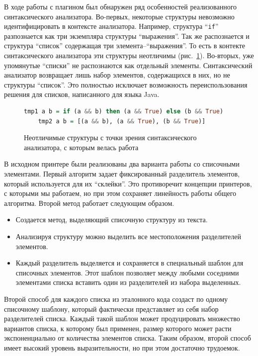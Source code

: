 В ходе работы с плагином был обнаружен ряд особенностей реализованного синтаксического анализатора. Во-первых, некоторые структуры невозможно идентифицировать в контексте анализатора. Например, структура ``\lstinline{if}'' разпознается как три экземпляра структуры ``выражения''. Так же распознается и структура ``список'' содержащая три элемента--``выражения''. То есть в контекте синтаксического анализатора эти структуры неотличимы (рис.~\ref{haskellAnalyzerIncorrect}). Во-вторых, уже упомянутые ``списки'' не распознаются как отдельный элементы. Синтаксический анализатор возвращает лишь набор элементов, содержащихся в них, но не структуры ``список''. Это полностью исключает возможность переиспользования решения для списков, написанного для языка Java.

\begin{figure}[H]
    \begin{lstlisting}[language=Haskell]
    tmp1 a b = if (a && b) then (a && True) else (b && True)
    tmp2 a b = [(a && b), (a && True), (b && True)]
    \end{lstlisting}
\caption{Неотличимые структуры с точки зрения синтаксического анализатора, с которым велась работа}   
\label{haskellAnalyzerIncorrect}
\end{figure}

В исходном принтере были реализованы два варианта работы со списочными элементами. Первый алгоритм задает фиксированный разделитель элементов, который используется для их ``склейки''. Это противоречит концепции принтеров, с которыми мы работаем, но при этом сохраняет линейность работы общего алгоритма.
Второй метод работает следующим образом. 

\begin{itemize}
\item Создается метод, выделяющий списочную структуру из текста.
\item Анализируя структуру можно выделить все местоположения разделителей элементов.
\item Каждый разделитель выделяется и сохраняется в специальный шаблон для списочных элементов. Этот шаблон позволяет между любыми соседними элементами списка вставить один из разделителей из набора выделенных. 
\end{itemize}

Второй способ для каждого списка из эталонного кода создаст по одному списочному шаблону, который фактически представляет из себя набор разделителей списка. Каждый такой шаблон может продуцировать множество вариантов списка, к которому был применен, размер которого может расти экспоненциально от количества элементов списка. Таким образом, второй способ имеет высокий уровень выразительности, но при этом достаточно трудоемок.

